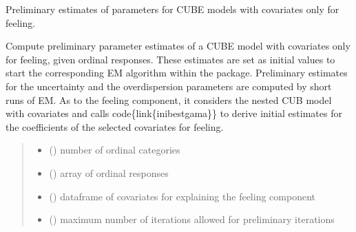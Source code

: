 \documentclass[letterpaper,10pt,english]{sphinxmanual}
\begin{document}

\begin{fulllineitems}
\label{\detokenize{cubmods:cubmods.cube_0w0.init_theta}}
\pysigstartsignatures
{}
\pysigstopsignatures
\sphinxAtStartPar
Preliminary estimates of parameters for CUBE models with covariates only for feeling.

\sphinxAtStartPar
Compute preliminary parameter estimates of a CUBE model with covariates only for feeling, given
ordinal responses. These estimates are set as initial values to start the corresponding E\sphinxhyphen{}M algorithm within the package.
Preliminary estimates for the uncertainty and the overdispersion parameters are computed by short runs of EM. 
As to the feeling component, it considers the nested CUB model with covariates and calls code\{link\{inibestgama\}\} to derive initial estimates for the coefficients
of the selected covariates for feeling.
\begin{quote}\begin{description}
\begin{itemize}
\item {} 
\sphinxAtStartPar
{} () \textendash{} number of ordinal categories

\item {} 
\sphinxAtStartPar
{} () \textendash{} array of ordinal responses

\item {} 
\sphinxAtStartPar
{} () \textendash{} dataframe of covariates for explaining the feeling component

\item {} 
\sphinxAtStartPar
{} () \textendash{} maximum number of iterations allowed for preliminary iterations


\end{itemize}
\end{description}
\end{quote}
\end{fulllineitems}
\end{document}
